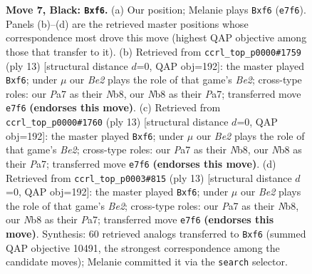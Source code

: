 \documentclass[11pt]{article}
\begin{document}
\begin{figure}[p]
\caption{\textbf{Move 7, Black: \texttt{Bxf6}.} (a) Our position; Melanie plays \texttt{Bxf6} (\texttt{e7f6}). Panels (b)--(d) are the retrieved master positions whose correspondence most drove this move (highest QAP objective among those that transfer to it). (b) Retrieved from \texttt{ccrl\_top\_p0000\#1759} (ply 13) [structural distance $d$=0, QAP obj=192]: the master played \texttt{Bxf6}; under $\mu$ our \emph{Be2} plays the role of that game's \emph{Be2}; cross-type roles: our \emph{P}a7 as their \emph{N}b8, our \emph{N}b8 as their \emph{P}a7; transferred move \texttt{e7f6} \textbf{(endorses this move)}. (c) Retrieved from \texttt{ccrl\_top\_p0000\#1760} (ply 13) [structural distance $d$=0, QAP obj=192]: the master played \texttt{Bxf6}; under $\mu$ our \emph{Be2} plays the role of that game's \emph{Be2}; cross-type roles: our \emph{P}a7 as their \emph{N}b8, our \emph{N}b8 as their \emph{P}a7; transferred move \texttt{e7f6} \textbf{(endorses this move)}. (d) Retrieved from \texttt{ccrl\_top\_p0003\#815} (ply 13) [structural distance $d$=0, QAP obj=192]: the master played \texttt{Bxf6}; under $\mu$ our \emph{Be2} plays the role of that game's \emph{Be2}; cross-type roles: our \emph{P}a7 as their \emph{N}b8, our \emph{N}b8 as their \emph{P}a7; transferred move \texttt{e7f6} \textbf{(endorses this move)}. Synthesis: 60 retrieved analogs transferred to \texttt{Bxf6} (summed QAP objective 10491, the strongest correspondence among the candidate moves); Melanie committed it via the \texttt{search} selector.}
\label{fig:thought-m13}
\end{figure}

\clearpage
\end{document}
